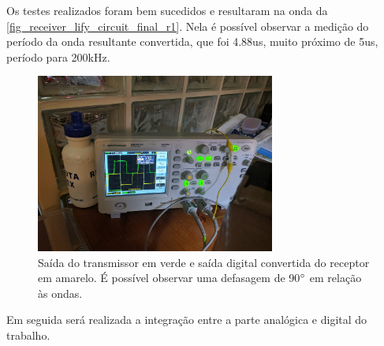 	Os testes realizados foram bem sucedidos e resultaram na onda da \autoref{fig_receiver_lify_circuit_final_r1}. Nela é possível observar a medição do período da onda resultante convertida, que foi 4.88us, muito próximo de 5us, período para 200kHz.
	
	\begin{figure}[htb]
		\caption{\label{fig_receiver_lify_circuit_final_r1} Saída do transmissor em verde e saída digital convertida do receptor em amarelo. É possível observar uma defasagem de 90$\degree$ em relação às ondas.}
		\centering
		\includegraphics[width=0.7\textwidth, trim={36cm 30cm 60cm 40cm}, clip]{circuits/photos/TXRX_final_fixed.jpg}
	\end{figure}
	
	Em seguida será realizada a integração entre a parte analógica e digital do trabalho.
